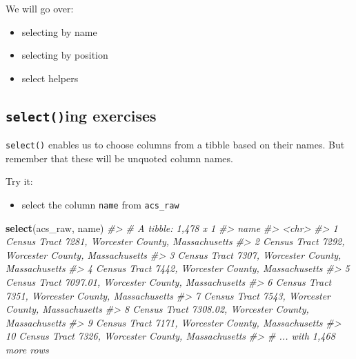 \documentclass[
]{book}
\newenvironment{Shaded}{\begin{snugshade}}{\end{snugshade}}
\newcommand{\CommentTok}[1]{\textcolor[rgb]{0.56,0.35,0.01}{\textit{#1}}}
\newcommand{\KeywordTok}[1]{\textcolor[rgb]{0.13,0.29,0.53}{\textbf{#1}}}
\newcommand{\NormalTok}[1]{#1}
\providecommand{\tightlist}{%
  \setlength{\itemsep}{0pt}\setlength{\parskip}{0pt}}
\begin{document}
We will go over:

\begin{itemize}
\tightlist
\item
  selecting by name
\item
  selecting by position
\item
  select helpers
\end{itemize}

\hypertarget{selecting-exercises}{%
\subsection{\texorpdfstring{\texttt{select()}ing exercises}{select()ing exercises}}\label{selecting-exercises}}

\texttt{select()} enables us to choose columns from a tibble based on their names. But remember that these will be unquoted column names.

Try it:

\begin{itemize}
\tightlist
\item
  select the column \texttt{name} from \texttt{acs\_raw}
\end{itemize}

\begin{Shaded}
\begin{Highlighting}[]
\KeywordTok{select}\NormalTok{(acs\_raw, name)}
\CommentTok{\#\textgreater{} \# A tibble: 1,478 x 1}
\CommentTok{\#\textgreater{}    name                                                 }
\CommentTok{\#\textgreater{}    \textless{}chr\textgreater{}                                                }
\CommentTok{\#\textgreater{}  1 Census Tract 7281, Worcester County, Massachusetts   }
\CommentTok{\#\textgreater{}  2 Census Tract 7292, Worcester County, Massachusetts   }
\CommentTok{\#\textgreater{}  3 Census Tract 7307, Worcester County, Massachusetts   }
\CommentTok{\#\textgreater{}  4 Census Tract 7442, Worcester County, Massachusetts   }
\CommentTok{\#\textgreater{}  5 Census Tract 7097.01, Worcester County, Massachusetts}
\CommentTok{\#\textgreater{}  6 Census Tract 7351, Worcester County, Massachusetts   }
\CommentTok{\#\textgreater{}  7 Census Tract 7543, Worcester County, Massachusetts   }
\CommentTok{\#\textgreater{}  8 Census Tract 7308.02, Worcester County, Massachusetts}
\CommentTok{\#\textgreater{}  9 Census Tract 7171, Worcester County, Massachusetts   }
\CommentTok{\#\textgreater{} 10 Census Tract 7326, Worcester County, Massachusetts   }
\CommentTok{\#\textgreater{} \# ... with 1,468 more rows}
\end{Highlighting}
\end{Shaded}
\end{document}
